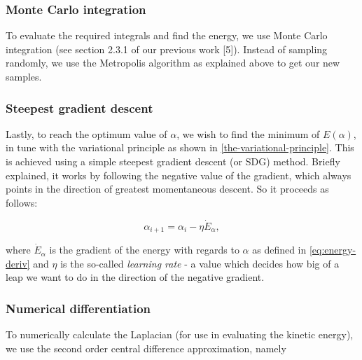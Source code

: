 \documentclass[
]{article}
\begin{document}
\hypertarget{monte-carlo-integration}{%
\subsubsection*{Monte Carlo integration}\label{monte-carlo-integration}}

To evaluate the required integrals and find the energy, we use Monte
Carlo integration (see section 2.3.1 of our previous work {[}5{]}).
Instead of sampling randomly, we use the Metropolis algorithm as
explained above to get our new samples.

\hypertarget{steepest-gradient-descent}{%
\subsubsection*{Steepest gradient
descent}\label{steepest-gradient-descent}}

Lastly, to reach the optimum value of \(\alpha\), we wish to find the
minimum of \(E(\alpha)\), in tune with the variational principle as
shown in \ref{the-variational-principle}. This is achieved using a
simple steepest gradient descent (or SDG) method. Briefly explained, it
works by following the negative value of the gradient, which always
points in the direction of greatest momentaneous descent. So it proceeds
as follows:

\begin{equation} \alpha_{i+1} = \alpha_i - \eta \dot E_\alpha,\label{eq:sgd}\end{equation}

where \(\dot E_\alpha\) is the gradient of the energy with regards to
\(\alpha\) as defined in \eqref{eq:energy-deriv} and \(\eta\) is the
so-called \emph{learning rate} - a value which decides how big of a leap
we want to do in the direction of the negative gradient.

\hypertarget{numerical-differentiation}{%
\subsubsection*{Numerical
differentiation}\label{numerical-differentiation}}

To numerically calculate the Laplacian (for use in evaluating the
kinetic energy), we use the second order central difference
approximation, namely
\end{document}

